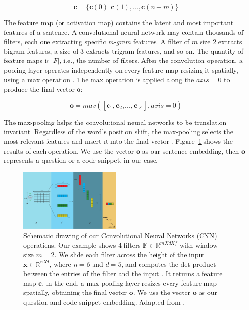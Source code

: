 \documentclass[sigconf]{acmart}
\begin{document}
\begin{equation}
    \bm{c} = \{ \bm{c}(0), \bm{c}(1), . . ., \bm{c}(n - m) \} 
\end{equation}

The feature map (or activation map) contains the latent and most important features of a sentence. A convolutional neural network may contain thousands of filters, each one extracting specific \emph{m-gram} features. A filter of $m$ size 2 extracts bigram features, a size of 3 extracts trigram features, and so on. The quantity of feature maps is $|F|$, i.e., the number of filters. After the convolution operation, a pooling layer operates independently on every feature map resizing it spatially, using a max operation \cite{karpathy-course-cnn-2016}.  The max operation is applied along the $axis=0$ to produce the final vector $\bm{o}$:

\begin{equation}
    \bm{o} = max\left(\left[\bm{c}_{1}, \bm{c}_{2}, . . ., \bm{c}_{|F|}\right], axis = 0\right)
\end{equation}

The max-pooling helps the convolutional neural networks to be translation invariant. Regardless of the word's position shift, the max-pooling selects the most relevant features and insert it into the final vector \citep{tom-young:trends-deep-learning-nlp}. Figure~\ref{fig:cnn-steps-word-embedding} shows the results of each operation. We use the vector $\bm{o}$ as our sentence embedding, then $\bm{o}$ represents a question or a code snippet, in our case. 

\begin{figure}[H]
    \centering
    \includegraphics[width=0.45\textwidth]{figuras/cnn-steps-word-embedding-article.pdf}
    \caption{Schematic drawing of our Convolutional Neural Networks (CNN) operations. Our example shows 4 filters $\bm{F} \in \mathbb{R}^{m X d X f}$ with window size $m = 2$. We slide each filter across the height of the input $\bm{x} \in \mathbb{R}^{n X d}$, where $n = 6$ and $d = 5$, and computes the dot product between the entries of the filter and the input \cite{karpathy-course-cnn-2016}. It returns a feature map $\bm{c}$. In the end, a max pooling layer resizes every feature map spatially, obtaining the final vector $\bm{o}$. We use the vector $\bm{o}$ as our question and code snippet embedding. Adapted from \cite{zhang-guide-convolutional-cnn-embedding-ilustration:2015}.}
    \label{fig:cnn-steps-word-embedding}
\end{figure}
\end{document}
